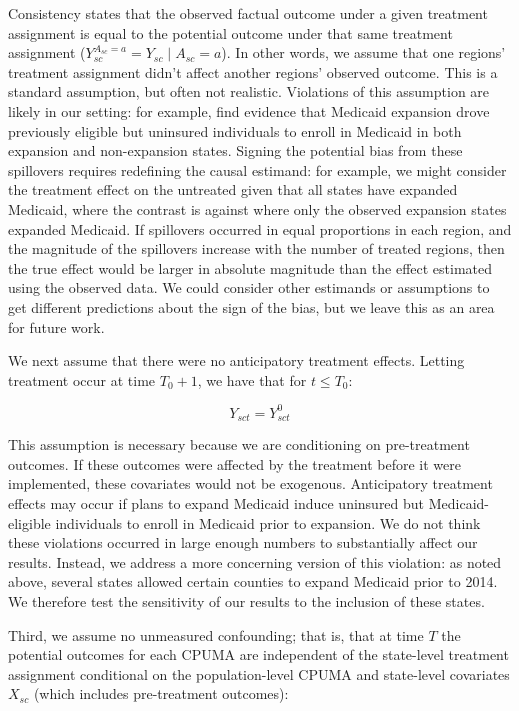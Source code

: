 \documentclass[12pt]{article}
\begin{document}
Consistency states that the observed factual outcome under a given treatment assignment is equal to the potential outcome under that same treatment assignment ($Y_{sc}^{A_{sc} = a} = Y_{sc} \mid A_{sc} = a$). In other words, we assume that one regions' treatment assignment didn't affect another regions' observed outcome. This is a standard assumption, but often not realistic. Violations of this assumption are likely in our setting: for example, \cite{frean2017premium} find evidence that Medicaid expansion drove previously eligible but uninsured individuals to enroll in Medicaid in both expansion and non-expansion states. Signing the potential bias from these spillovers requires redefining the causal estimand: for example, we might consider the treatment effect on the untreated given that all states have expanded Medicaid, where the contrast is against where only the observed expansion states expanded Medicaid. If spillovers occurred in equal proportions in each region, and the magnitude of the spillovers increase with the number of treated regions, then the true effect would be larger in absolute magnitude than the effect estimated using the observed data. We could consider other estimands or assumptions to get different predictions about the sign of the bias, but we leave this as an area for future work.

We next assume that there were no anticipatory treatment effects. Letting treatment occur at time $T_0 + 1$, we have that for $t \le T_0$:

$$
Y_{sct} = Y_{sct}^0
$$

This assumption is necessary because we are conditioning on pre-treatment outcomes. If these outcomes were affected by the treatment before it were implemented, these covariates would not be exogenous. Anticipatory treatment effects may occur if plans to expand Medicaid induce uninsured but Medicaid-eligible individuals to enroll in Medicaid prior to expansion. We do not think these violations occurred in large enough numbers to substantially affect our results. Instead, we address a more concerning version of this violation: as noted above, several states allowed certain counties to expand Medicaid prior to 2014. We therefore test the sensitivity of our results to the inclusion of these states.

Third, we assume no unmeasured confounding; that is, that at time $T$ the potential outcomes for each CPUMA are independent of the state-level treatment assignment conditional on the population-level CPUMA and state-level covariates $X_{sc}$ (which includes pre-treatment outcomes):
\end{document}
